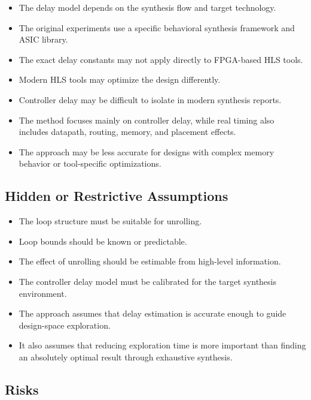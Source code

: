 \documentclass[conference]{IEEEtran}
\begin{document}
\begin{itemize}
    \item The delay model depends on the synthesis flow and target technology.
    \item The original experiments use a specific behavioral synthesis framework and ASIC library.
    \item The exact delay constants may not apply directly to FPGA-based HLS tools.
    \item Modern HLS tools may optimize the design differently.
    \item Controller delay may be difficult to isolate in modern synthesis reports.
    \item The method focuses mainly on controller delay, while real timing also includes datapath, routing, memory, and placement effects.
    \item The approach may be less accurate for designs with complex memory behavior or tool-specific optimizations.
\end{itemize}

\subsection{Hidden or Restrictive Assumptions}

\begin{itemize}
    \item The loop structure must be suitable for unrolling.
    \item Loop bounds should be known or predictable.
    \item The effect of unrolling should be estimable from high-level information.
    \item The controller delay model must be calibrated for the target synthesis environment.
    \item The approach assumes that delay estimation is accurate enough to guide design-space exploration.
    \item It also assumes that reducing exploration time is more important than finding an absolutely optimal result through exhaustive synthesis.
\end{itemize}

\subsection{Risks}
\end{document}
